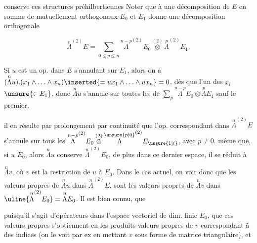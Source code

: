conserve ces structures préhilbertiennes  Noter que à une décomposition de $E$  en somme de  mutuellement orthogonaux $E_0$ et $E_1$ donne une décomposition orthogonale

\[
\overset{n}{\Lambda}^{(2)}E=\sum_{0\leq p\leq n}\overset{n-p}{\Lambda}^{(2)}E_0\overset{(2)}{\otimes}\overset{p}{\Lambda}^{(2)}E_1 .
\]

Si $u$ est un op. dans $E$ s'annulant sur $E_1$, alors on a $(\overset{n}{\Lambda}u).(x_1\wedge\ldots\wedge x_n)\inserted{=ux_1\wedge\ldots\wedge ux_n}=0$,  dès que l'un  des $x_i$  $\unsure{\in E_1}$, donc $\overset{n}{\Lambda}u$ s'annule sur  toutes les   de $\sum_p\overset{n-p}{\Lambda}E_0\otimes\overset{p}{\Lambda}E_1$ sauf le premier, 

il en résulte par prolongement par continuité que l'op. correspondant dans $\overset{n}{\Lambda}^{(2)}E$ s'annule sur tous les $\overset{n-p}{\Lambda}^{(2)}E_0\overset{(2)}{\otimes}\overset{\unsure{p|0}}{\Lambda}^{(2)}E_{\unsure{1|i}}$,  avec $p\neq0$.   même que, si $u$  $E_0$, alors $\overset{n}{\Lambda}u$ conserve $\overset{n}{\Lambda}^{(2)}E_0$, de plus dans   ce dernier espace, il se réduit à

$\overset{n}{\Lambda}v$, où $v$ est la restriction de $u$ à $E_0$. Dans le cas actuel,   on voit donc que  les valeurs propres de $\overset{n}{\Lambda}u$ dans $\overset{n}{\Lambda}^{(2)}E$, sont les valeurs propres de $\overset{n}{\Lambda}v$ dans $\uline{\overset{n}{\Lambda}^{(2)}E_0}=\overset{n}{\Lambda}E_0$. Il est bien connu, que

  puisqu'il s'agit d'opérateurs dans l'espace vectoriel de dim. finie $E_0$, que ces valeurs propres s'obtiennent en   les produits   valeurs propres de $v$ correspondant à des indices  (on le voit par ex en mettant $v$ sous forme de matrice triangulaire), et
